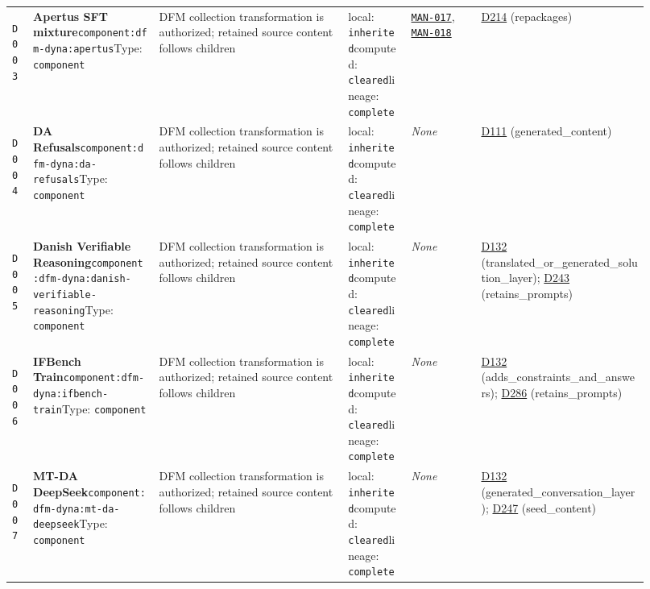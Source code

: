 \documentclass[9pt,a4paper]{article}
\newcommand{\depid}[1]{\hypertarget{dep:#1}{\texttt{#1}}}
\begin{document}
\begin{landscape}
\begin{longtable}{@{}L{0.035\linewidth}L{0.185\linewidth}L{0.27\linewidth}L{0.09\linewidth}L{0.10\linewidth}L{0.24\linewidth}@{}}
\depid{D003} & \textbf{Apertus SFT mixture}\newline \nolinkurl{component:dfm-dyna:apertus}\newline Type: \texttt{component} & DFM collection transformation is authorized; retained source content follows children & local: \texttt{inherited}\newline computed: \texttt{cleared}\newline lineage: \texttt{complete} & \hyperlink{manual:MAN-017}{\texttt{MAN-017}}, \hyperlink{manual:MAN-018}{\texttt{MAN-018}} & \hyperlink{dep:D214}{D214} (repackages) \\
\depid{D004} & \textbf{DA Refusals}\newline \nolinkurl{component:dfm-dyna:da-refusals}\newline Type: \texttt{component} & DFM collection transformation is authorized; retained source content follows children & local: \texttt{inherited}\newline computed: \texttt{cleared}\newline lineage: \texttt{complete} & \textit{None} & \hyperlink{dep:D111}{D111} (generated\_content) \\
\depid{D005} & \textbf{Danish Verifiable Reasoning}\newline \nolinkurl{component:dfm-dyna:danish-verifiable-reasoning}\newline Type: \texttt{component} & DFM collection transformation is authorized; retained source content follows children & local: \texttt{inherited}\newline computed: \texttt{cleared}\newline lineage: \texttt{complete} & \textit{None} & \hyperlink{dep:D132}{D132} (translated\_or\_generated\_solution\_layer); \hyperlink{dep:D243}{D243} (retains\_prompts) \\
\depid{D006} & \textbf{IFBench Train}\newline \nolinkurl{component:dfm-dyna:ifbench-train}\newline Type: \texttt{component} & DFM collection transformation is authorized; retained source content follows children & local: \texttt{inherited}\newline computed: \texttt{cleared}\newline lineage: \texttt{complete} & \textit{None} & \hyperlink{dep:D132}{D132} (adds\_constraints\_and\_answers); \hyperlink{dep:D286}{D286} (retains\_prompts) \\
\depid{D007} & \textbf{MT-DA DeepSeek}\newline \nolinkurl{component:dfm-dyna:mt-da-deepseek}\newline Type: \texttt{component} & DFM collection transformation is authorized; retained source content follows children & local: \texttt{inherited}\newline computed: \texttt{cleared}\newline lineage: \texttt{complete} & \textit{None} & \hyperlink{dep:D132}{D132} (generated\_conversation\_layer); \hyperlink{dep:D247}{D247} (seed\_content) \\

\end{longtable}
\end{landscape}
\end{document}
